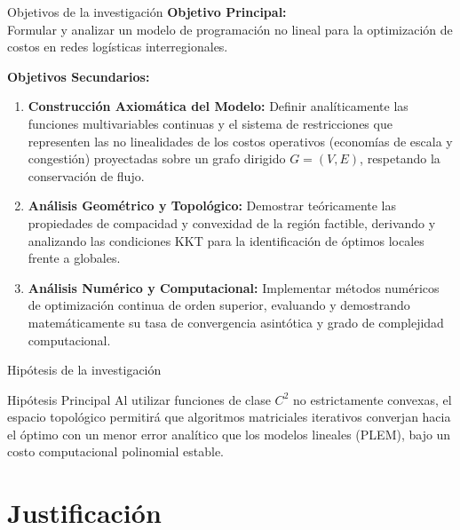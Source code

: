 \documentclass[10pt]{beamer}
\begin{document}
\begin{frame}{Objetivos de la investigación}
    \textbf{Objetivo Principal:}\\
    Formular y analizar un modelo de programación no lineal para la optimización de costos en redes logísticas interregionales.
    
    \vspace{0.3cm}
    \textbf{Objetivos Secundarios:}
    \small
    \begin{enumerate}
        \item \textbf{Construcción Axiomática del Modelo:} Definir analíticamente las funciones multivariables continuas y el sistema de restricciones que representen las no linealidades de los costos operativos (economías de escala y congestión) proyectadas sobre un grafo dirigido $G=(V,E)$, respetando la conservación de flujo.
        \item \textbf{Análisis Geométrico y Topológico:} Demostrar teóricamente las propiedades de compacidad y convexidad de la región factible, derivando y analizando las condiciones KKT para la identificación de óptimos locales frente a globales.
        \item \textbf{Análisis Numérico y Computacional:} Implementar métodos numéricos de optimización continua de orden superior, evaluando y demostrando matemáticamente su tasa de convergencia asintótica y grado de complejidad computacional.
    \end{enumerate}
\end{frame}

\begin{frame}{Hipótesis de la investigación}
    \begin{block}{Hipótesis Principal}
    Al utilizar funciones de clase $C^2$ no estrictamente convexas, el espacio topológico permitirá que algoritmos matriciales iterativos converjan hacia el óptimo con un menor error analítico que los modelos lineales (PLEM), bajo un costo computacional polinomial estable.
    \end{block}
\end{frame}

\section{Justificación}
\end{document}
